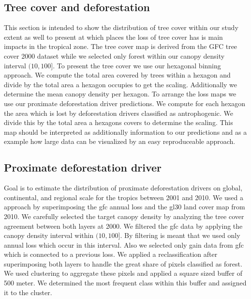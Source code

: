 		\subsection{Tree cover and deforestation}
		\label{subsec:results_tree_cover_and_deforestation}
			 This section is intended to show the distribution of tree cover within our study extent as well to present at which places the loss of tree cover has is main impacts in the tropical zone. The tree cover map is derived from the \ac{GFC} tree cover 2000 dataset while we selected only forest within our canopy density interval $(10,100]$. To present the tree cover we use our hexagonal binning approach. We compute the total area covered by trees within a hexagon and divide by the total area a hexagon occupies to get the scaling. Additionally we determine the mean canopy density per hexagon. To arrange the loss maps we use our proximate deforestation driver predictions. We compute for each hexagon the area which is lost by deforestation drivers classified as antrophogenic. We divide this by the total area a hexagons covers to determine the scaling. This map should be interpreted as additionally information to our predictions and as a example how large data can be visualized by an easy reproduceable approach.

		\subsection{Proximate deforestation driver}
		\label{subsec:results_proxy_deforestation_driver}
			 Goal is to estimate the distribution of proximate deforestation drivers on global, continental, and regional scale for the tropics between 2001 and 2010. We used a approach by superimposing the gfc annual loss and the gl30 land cover map from 2010. We carefully selected the target canopy density by analyzing the tree cover agreement between both layers at 2000. We filtered the gfc data by applying the canopy density interval within $(10,100]$. By filtering is meant that we used only annual loss which occur in this interval. Also we selected only gain data from gfc which is connected to a previous loss. We applied a reclassification after superimposing both layers to handle the great share of pixels classified as forest. We used clustering to aggregate these pixels and applied a square sized buffer of 500 meter. We determined the most frequent class within this buffer and assigned it to the cluster.

